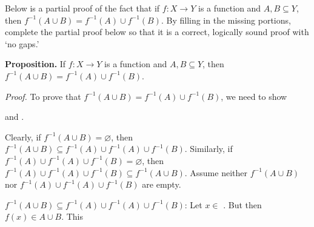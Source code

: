 \documentclass[11pt,letterpaper]{article}
\newcommand{\blank}[1]{\underline{\hspace{#1}}} %
\begin{document}
%	
%	
%	
%	
%
%	
%	



\newpage
 Below is a partial proof of the fact that if $f: X \to Y$ is a function and $A, B \subseteq Y$, then $f^{-1}(A \cup B)= f^{-1}(A) \cup f^{-1}(B)$. By filling in the missing portions, complete the partial proof below so that it is a correct, logically sound proof with `no gaps.' \pspace

\noindent \textbf{Proposition.} If $f: X \to Y$ is a function and $A, B \subseteq Y$, then $f^{-1}(A \cup B)= f^{-1}(A) \cup f^{-1}(B)$. \pspace

\textit{Proof.} To prove that $f^{-1}(A \cup B)= f^{-1}(A) \cup f^{-1}(B)$, we need to show \blank{5cm} \pspace

and \blank{5cm}. 


Clearly, if $f^{-1}(A \cup B)= \varnothing$, then $f^{-1}(A \cup B) \subseteq f^{-1}(A) \cup f^{-1}(A) \cup f^{-1}(B)$. Similarly, if $f^{-1}(A) \cup f^{-1}(A) \cup f^{-1}(B)= \varnothing$, then $f^{-1}(A) \cup f^{-1}(A) \cup f^{-1}(B) \subseteq f^{-1}(A \cup B)$. Assume neither $f^{-1}(A \cup B)$ nor $f^{-1}(A) \cup f^{-1}(A) \cup f^{-1}(B)$ are empty. 

$f^{-1}(A \cup B) \subseteq f^{-1}(A) \cup f^{-1}(A) \cup f^{-1}(B)$: Let $x \in$ \blank{3cm}. But then $f(x) \in A \cup B$. This \pspace
\end{document}
